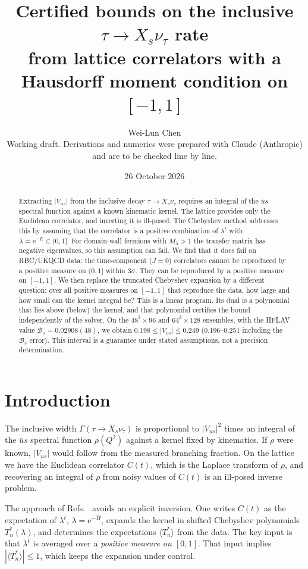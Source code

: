 \documentclass[11pt]{article}
\title{Certified bounds on the inclusive $\tau\to X_s\nu_\tau$ rate\\ from lattice correlators with a Hausdorff moment condition on $[-1,1]$}
\author{Wei-Lun Chen\\[0.2em]
{\small Working draft. Derivations and numerics were prepared with Claude (Anthropic)}\\{\small and are to be checked line by line.}}
\date{26 October 2026}
\newcommand{\ee}{\mathrm{e}}
\newcommand{\Vus}{|V_{us}|}
\newcommand{\BR}{\mathcal{B}}
\theoremstyle{remark}
\begin{document}
\maketitle

\begin{abstract}
Extracting $\Vus$ from the inclusive decay $\tau\to X_s\nu_\tau$ requires an integral of the $\bar us$ spectral function against a known kinematic kernel.
The lattice provides only the Euclidean correlator, and inverting it is ill-posed. The Chebyshev method addresses this by assuming that the correlator is a positive
combination of $\lambda^t$ with $\lambda=\ee^{-E}\in(0,1]$. For domain-wall fermions with $M_5>1$ the transfer matrix has negative eigenvalues, so this assumption
can fail. We find that it does fail on RBC/UKQCD data: the time-component ($J=0$) correlators cannot be reproduced by a positive measure on $(0,1]$ within $3\sigma$.
They can be reproduced by a positive measure on $[-1,1]$.
We then replace the truncated Chebyshev expansion by a different question: over all positive measures on $[-1,1]$ that reproduce the data, how large and how small
can the kernel integral be? This is a linear program. Its dual is a polynomial that lies above (below) the kernel, and that polynomial certifies the bound independently of the solver.
On the $48^3\times96$ and $64^3\times128$ ensembles, with the HFLAV value $\BR_s=0.02908(48)$, we obtain $0.198\le\Vus\le0.249$ ($0.196$--$0.251$ including the $\BR_s$ error).
This interval is a guarantee under stated assumptions, not a precision determination.
\end{abstract}

\setcounter{tocdepth}{1}
\tableofcontents

\section{Introduction}
The inclusive width $\Gamma(\tau\to X_s\nu_\tau)$ is proportional to $\Vus^2$ times an integral of the $\bar us$ spectral function $\rho(Q^2)$ against a kernel fixed by kinematics.
If $\rho$ were known, $\Vus$ would follow from the measured branching fraction. On the lattice we have the Euclidean correlator $C(t)$, which is the Laplace transform of $\rho$, and
recovering an integral of $\rho$ from noisy values of $C(t)$ is an ill-posed inverse problem.

The approach of Refs.~\cite{Hashimoto:2017,Bailas:2020,Gambino:2020} avoids an explicit inversion. One writes $C(t)$ as the expectation of $\lambda^t$, $\lambda=\ee^{-\hat H}$, expands the kernel in
shifted Chebyshev polynomials $T^*_n(\lambda)$, and determines the expectations $\langle T^*_n\rangle$ from the data. The key input is that $\lambda^t$ is averaged over a \emph{positive measure
on $[0,1]$}. That input implies $|\langle T^*_n\rangle|\le1$, which keeps the expansion under control.
\end{document}
